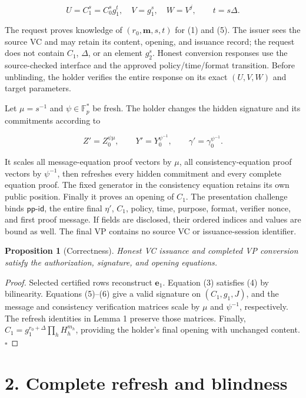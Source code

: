 \documentclass[11pt]{article}
\newtheorem{proposition}{Proposition}
\begin{document}
\[
U=C_1^s=C_0^s g_1^t,\quad V=g_1^s,\quad W=V^j,
\qquad t=s\Delta.
\tag{5}
\]

The request proves knowledge of \((r_0,\boldsymbol m,s,t)\) for (1) and (5). The issuer sees the source VC and may retain its content, opening, and issuance record; the request does not contain \(C_1\), \(\Delta\), or an element \(g_2^s\). Honest conversion responses use the source-checked interface and the approved policy/time/format transition. Before unblinding, the holder verifies the entire response on its exact \((U,V,W)\) and target parameters.

Let \(\mu=s^{-1}\) and \(\psi\in\mathbb F_p^*\) be fresh. The holder changes the hidden signature and its commitments according to

\[
Z'=Z_0^{\psi\mu},\qquad Y'=Y_0^{\psi^{-1}},\qquad
\gamma'=\gamma_0^{\psi^{-1}}.
\tag{6}
\]

It scales all message-equation proof vectors by \(\mu\), all consistency-equation proof vectors by \(\psi^{-1}\), then refreshes every hidden commitment and every complete equation proof. The fixed generator in the consistency equation retains its own public position. Finally it proves an opening of \(C_1\). The presentation challenge binds \(\mathsf{pp\text{-}id}\), the entire final \(\eta'\), \(C_1\), policy, time, purpose, format, verifier nonce, and first proof message. If fields are disclosed, their ordered indices and values are bound as well. The final VP contains no source VC or issuance-session identifier.

\begin{proposition}[Correctness]
Honest VC issuance and completed VP conversion satisfy the authorization, signature, and opening equations.

\end{proposition}
\begin{proof}
Selected certified rows reconstruct \(\boldsymbol e_1\). Equation (3) satisfies (4) by bilinearity. Equations (5)–(6) give a valid signature on \((C_1,g_1,J)\), and the message and consistency verification matrices scale by \(\mu\) and \(\psi^{-1}\), respectively. The refresh identities in Lemma 1 preserve those matrices. Finally, \(C_1=g_1^{r_0+\Delta}\prod_hH_h^{m_h}\), providing the holder's final opening with unchanged content. \(\square\)

\end{proof}
\section*{2. Complete refresh and blindness}
\end{document}
